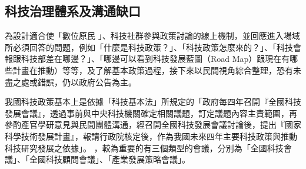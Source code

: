 \documentclass[12pt,a4paper]{article}
\begin{document}
\subsection{科技治理體系及溝通缺口 }
\label{sec:org3cf3a0c}
為設計適合使「數位原民 」、科技社群參與政策討論的線上機制，並回應進入場域所必須回答的問題，例如「什麼是科技政策？」、「科技政策怎麼來的？」、「科技會報跟科技部差在哪邊？」、「哪邊可以看到科技發展藍圖（Road Map）跟現在有哪些計畫在推動）等等，及了解基本政策過程，接下來以民間視角綜合整理，恐有未盡之處或錯誤，仍以政府公告為主。

我國科技政策基本上是依據「科技基本法」所規定的「政府每四年召開『全國科技發展會議』，透過事前與中央科技機關確定相關議題，訂定議題內容主責範圍，再參酌產官學研意見與民間團體溝通，經召開全國科技發展會議討論後，提出『國家科學技術發展計畫』，報請行政院核定後，作為我國未來四年主要科技政策與推動科技研究發展之依據」。 \citep*{guo17} ，較為重要的有三個類型的會議，分別為「全國科技會議」、「全國科技顧問會議」、「產業發展策略會議」。
\end{document}
